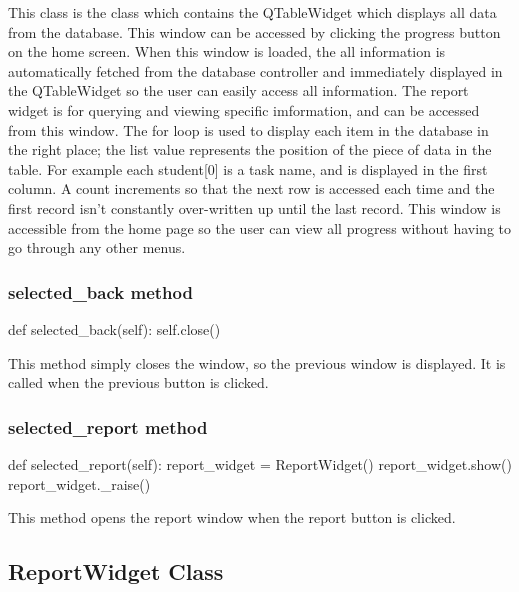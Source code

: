 This class is the class which contains the QTableWidget which displays all data from the database. This window can be accessed by clicking the progress button on the home screen. When this window is loaded, the all information is automatically fetched from the database controller and immediately displayed in the QTableWidget so the user can easily access all information. The report widget is for querying and viewing specific imformation, and can be accessed from this window. The for loop is used to display each item in the database in the right place; the list value represents the position of the piece of data in the table. For example each student[0] is a task name, and is displayed in the first column. A count increments so that the next row is accessed each time and the first record isn't constantly over-written up until the last record. This window is accessible from the home page so the user can view all progress without having to go through any other menus.

\subsubsection{selected\_back method}

\begin{python}
def selected_back(self):
        self.close()
\end{python}

This method simply closes the window, so the previous window is displayed. It is called when the previous button is clicked.

\subsubsection{selected\_report method}

\begin{python}
def selected_report(self):
        report_widget = ReportWidget()
        report_widget.show()
        report_widget._raise()
\end{python}

This method opens the report window when the report button is clicked.

\subsection{ReportWidget Class}

